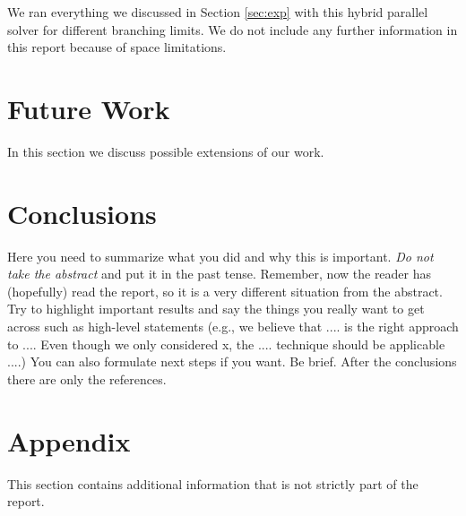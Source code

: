 \documentclass[letterpaper]{article}
\begin{document}
We ran everything we discussed in Section \ref{sec:exp} with this hybrid parallel solver for different branching limits.
We do not include any further information in this report because of space limitations.

\section{Future Work}
In this section we discuss possible extensions of our work.

\section{Conclusions}

Here you need to summarize what you did and why this is
important. {\em Do not take the abstract} and put it in the past
tense. Remember, now the reader has (hopefully) read the report, so it
is a very different situation from the abstract. Try to highlight
important results and say the things you really want to get across
such as high-level statements (e.g., we believe that .... is the right
approach to .... Even though we only considered x, the
.... technique should be applicable ....) You can also formulate next
steps if you want. Be brief. After the conclusions there are only the references.




\newpage
\section{Appendix}
This section contains additional information that is not strictly part of the report.
\end{document}
